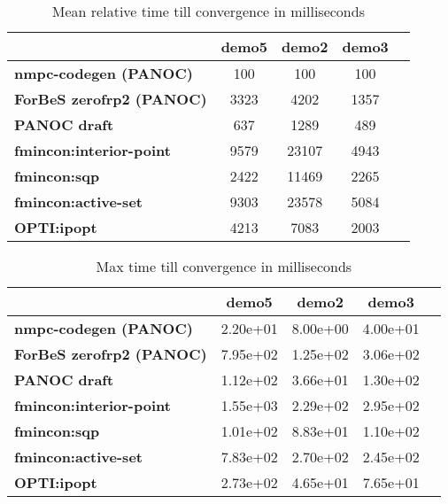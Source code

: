 \begin{table}[H]
	\centering
	\begin{tabular}{|l|c|c|c|c|}
		\hline
		&\textbf{demo5}&\textbf{demo2}&\textbf{demo3}\\\hline
		\textbf{nmpc-codegen (PANOC)}&100&100&100\\\hline
		\textbf{ForBeS zerofrp2 (PANOC)}&3323&4202&1357\\\hline
		\textbf{PANOC draft}&637&1289&489\\\hline
		\textbf{fmincon:interior-point}&9579&23107&4943\\\hline
		\textbf{fmincon:sqp}&2422&11469&2265\\\hline
		\textbf{fmincon:active-set}&9303&23578&5084\\\hline
		\textbf{OPTI:ipopt}&4213&7083&2003\\\hline
	\end{tabular}
	\caption{Mean relative time till convergence in milliseconds}
	\label{tbl:mean relative time till convergence}
\end{table}

\begin{table}[H]
	\centering
	\begin{tabular}{|l|c|c|c|c|}
		\hline
		&\textbf{demo5}&\textbf{demo2}&\textbf{demo3}\\\hline
		\textbf{nmpc-codegen (PANOC)}&2.20e+01&8.00e+00&4.00e+01\\\hline
		\textbf{ForBeS zerofrp2 (PANOC)}&7.95e+02&1.25e+02&3.06e+02\\\hline
		\textbf{PANOC draft}&1.12e+02&3.66e+01&1.30e+02\\\hline
		\textbf{fmincon:interior-point}&1.55e+03&2.29e+02&2.95e+02\\\hline
		\textbf{fmincon:sqp}&1.01e+02&8.83e+01&1.10e+02\\\hline
		\textbf{fmincon:active-set}&7.83e+02&2.70e+02&2.45e+02\\\hline
		\textbf{OPTI:ipopt}&2.73e+02&4.65e+01&7.65e+01\\\hline
	\end{tabular}
	\caption{Max time till convergence in milliseconds}
	\label{tbl:max time till convergence}
\end{table}

